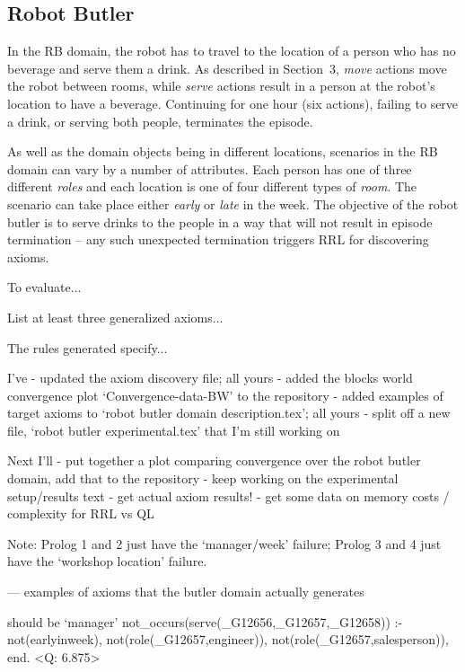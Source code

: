 


\subsection{Robot Butler}

In the RB domain, the robot has to travel to the location of a person who 
has no beverage and serve them a drink. As described in Section~3, 
\textit{move} actions move the robot between rooms, while \textit{serve} 
actions result in a person at the robot's location to have a beverage. 
Continuing for one hour (six actions), failing to serve a drink, or serving 
both people, terminates the episode.

As well as the domain objects being in different locations, scenarios in the RB 
domain can vary by a number of attributes. 
Each person has one of three different \textit{roles} and each location is one 
of four different types of \textit{room}. The scenario can take place either 
\textit{early} or \textit{late} in the week. 
The objective of the robot butler is to serve drinks to the people in a way 
that will not result in episode termination -- any such unexpected termination 
triggers RRL for discovering axioms.

To evaluate...

List at least three generalized axioms...

The rules generated specify...



I've
- updated the axiom discovery file; all yours
- added the blocks world convergence plot `Convergence-data-BW' to the repository
- added examples of target axioms to `robot butler domain description.tex'; all yours
- split off a new file, `robot butler experimental.tex' that I'm still working on

Next I'll
- put together a plot comparing convergence over the robot butler domain, add that to the repository
- keep working on the experimental setup/results text
- get actual axiom results!
- get some data on memory costs / complexity for RRL vs QL

Note: Prolog 1 and 2 just have the `manager/week' failure; Prolog 3 and 4 just have the `workshop location' failure.

--- examples of axioms that the butler domain actually generates

should be `manager'
not_occurs(serve(_G12656,_G12657,_G12658)) :- not(earlyinweek), not(role(_G12657,engineer)), not(role(_G12657,salesperson)), end.
<Q: 6.875>

